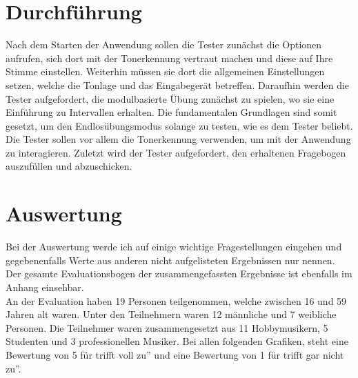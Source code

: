 \section{Durchführung}
Nach dem Starten der Anwendung sollen die Tester zunächst die Optionen aufrufen, sich dort mit der Tonerkennung vertraut machen und diese auf Ihre Stimme einstellen. Weiterhin müssen sie dort die allgemeinen Einstellungen setzen, welche die Tonlage und das Eingabegerät betreffen. Daraufhin werden die Tester aufgefordert, die modulbasierte Übung zunächst zu spielen, wo sie eine Einführung zu Intervallen erhalten. Die fundamentalen Grundlagen sind somit gesetzt, um den Endlosübungsmodus solange zu testen, wie es dem Tester beliebt. Die Tester sollen vor allem die Tonerkennung verwenden, um mit der Anwendung zu interagieren. Zuletzt wird der Tester aufgefordert, den erhaltenen Fragebogen auszufüllen und abzuschicken. 

\newpage
\section{Auswertung}
Bei der Auswertung werde ich auf einige wichtige Fragestellungen eingehen und gegebenenfalls Werte aus anderen nicht aufgelisteten Ergebnissen nur nennen. Der gesamte Evaluationsbogen der zusammengefassten Ergebnisse ist ebenfalls im Anhang einsehbar. \\
An der Evaluation haben 19 Personen teilgenommen, welche zwischen 16 und 59 Jahren alt waren. Unter den Teilnehmern waren 12 männliche und 7 weibliche Personen. Die Teilnehmer waren zusammengesetzt aus 11 Hobbymusikern, 5 Studenten und 3 professionellen Musiker. Bei allen folgenden Grafiken, steht eine Bewertung von 5 für \glqq trifft voll zu'' und eine Bewertung von 1 für \glqq trifft gar nicht zu''.

